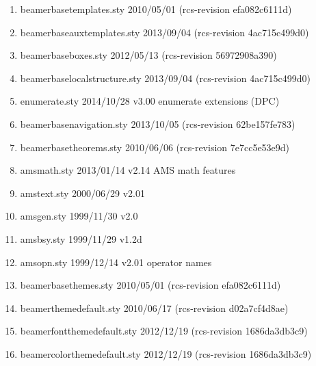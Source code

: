 \begin{enumerate}
\item beamerbasetemplates.sty 2010/05/01 (rcs-revision efa082c6111d)
\item beamerbaseauxtemplates.sty 2013/09/04 (rcs-revision 4ac715c499d0)
\item beamerbaseboxes.sty 2012/05/13 (rcs-revision 56972908a390)
\item beamerbaselocalstructure.sty 2013/09/04 (rcs-revision 4ac715c499d0)
\item enumerate.sty 2014/10/28 v3.00 enumerate extensions (DPC)
\item beamerbasenavigation.sty 2013/10/05 (rcs-revision 62be157fe783)
\item beamerbasetheorems.sty 2010/06/06 (rcs-revision 7e7cc5e53e9d)
\item amsmath.sty 2013/01/14 v2.14 AMS math features
\item amstext.sty 2000/06/29 v2.01
\item amsgen.sty 1999/11/30 v2.0
\item amsbsy.sty 1999/11/29 v1.2d
\item amsopn.sty 1999/12/14 v2.01 operator names
\item beamerbasethemes.sty 2010/05/01 (rcs-revision efa082c6111d)
\item beamerthemedefault.sty 2010/06/17 (rcs-revision d02a7cf4d8ae)
\item beamerfontthemedefault.sty 2012/12/19 (rcs-revision 1686da3db3c9)
\item beamercolorthemedefault.sty 2012/12/19 (rcs-revision 1686da3db3c9)

\end{enumerate}

